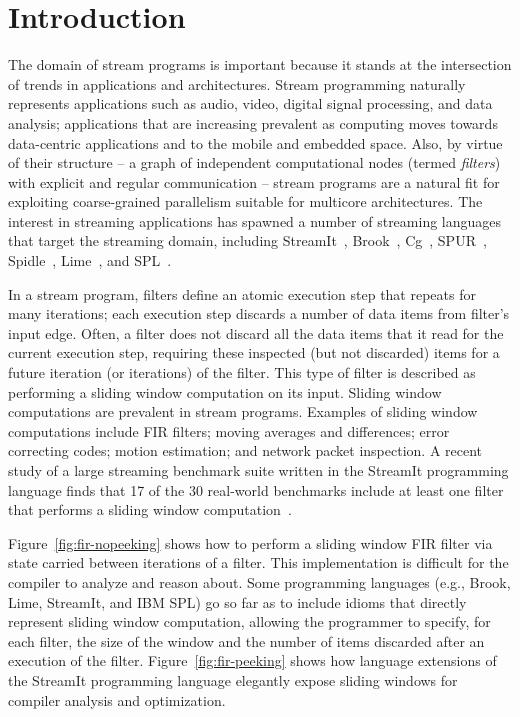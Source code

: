 \section{Introduction}

The domain of stream programs is important because it stands at the
intersection of trends in applications and architectures.  Stream
programming naturally represents applications such as audio, video,
digital signal processing, and data analysis; applications that are
increasing prevalent as computing moves towards data-centric
applications and to the mobile and embedded space.  Also, by virtue of
their structure -- a graph of independent computational nodes (termed
{\it filters}) with explicit and regular communication -- stream
programs are a natural fit for exploiting coarse-grained parallelism
suitable for multicore architectures.  The interest in streaming
applications has spawned a number of streaming languages that target
the streaming domain, including StreamIt~\cite{streamitcc},
Brook~\cite{brook04}, Cg~\cite{cg03},
SPUR~\cite{spur05samos}, Spidle~\cite{spidle03}, Lime~\cite{lime10},
and SPL~\cite{spl09}.

In a stream program, filters define an atomic execution step that
repeats for many iterations; each execution step discards a number of
data items from filter's input edge.  Often, a filter does not discard
all the data items that it read for the current execution step,
requiring these inspected (but not discarded) items for a future
iteration (or iterations) of the filter.  This type of filter is
described as performing a sliding window computation on its
input. Sliding window computations are prevalent in stream programs.
Examples of sliding window computations include FIR filters; moving
averages and differences; error correcting codes; motion estimation;
and network packet inspection.  A recent study of a large streaming
benchmark suite written in the StreamIt programming language finds
that 17 of the 30 real-world benchmarks include at least one filter
that performs a sliding window computation~\cite{streamit-suite}.


Figure~\ref{fig:fir-nopeeking} shows how to perform a sliding
window FIR filter via state carried between iterations of a filter.
This implementation is difficult for the compiler to analyze and
reason about.  Some programming languages (e.g., Brook, Lime,
StreamIt, and IBM SPL) go so far as to include idioms that directly
represent sliding window computation, allowing the programmer to
specify, for each filter, the size of the window and the number of
items discarded after an execution of the filter.
Figure~\ref{fig:fir-peeking} shows how language extensions of the
StreamIt programming language elegantly expose sliding windows for
compiler analysis and optimization.

